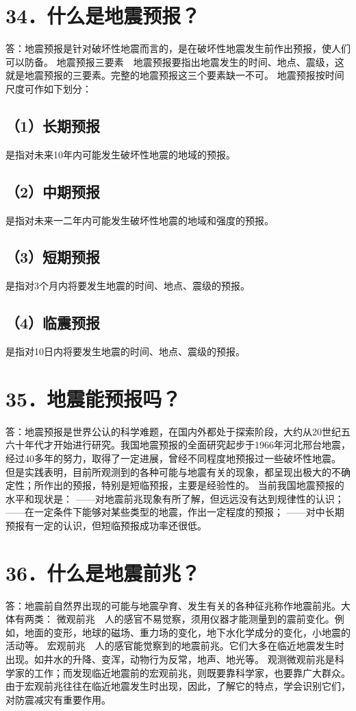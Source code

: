 \documentclass[a4paper,10pt,english]{sphinxmanual}
\begin{document}
\section{34．什么是地震预报？}
\label{\detokenize{index:id36}}
答：地震预报是针对破坏性地震而言的，是在破坏性地震发生前作出预报，使人们可以防备。
地震预报三要素　地震预报要指出地震发生的时间、地点、震级，这就是地震预报的三要素。完整的地震预报这三个要素缺一不可。
地震预报按时间尺度可作如下划分：


\subsection{（1）长期预报}
\label{\detokenize{index:id37}}
是指对未来10年内可能发生破坏性地震的地域的预报。


\subsection{（2）中期预报}
\label{\detokenize{index:id38}}
是指对未来一二年内可能发生破坏性地震的地域和强度的预报。


\subsection{（3）短期预报}
\label{\detokenize{index:id39}}
是指对3个月内将要发生地震的时间、地点、震级的预报。


\subsection{（4）临震预报}
\label{\detokenize{index:id40}}
是指对10日内将要发生地震的时间、地点、震级的预报。


\section{35．地震能预报吗？}
\label{\detokenize{index:id41}}
答：地震预报是世界公认的科学难题，在国内外都处于探索阶段，大约从20世纪五六十年代才开始进行研究。我国地震预报的全面研究起步于1966年河北邢台地震，经过40多年的努力，取得了一定进展，曾经不同程度地预报过一些破坏性地震。
但是实践表明，目前所观测到的各种可能与地震有关的现象，都呈现出极大的不确定性；所作出的预报，特别是短临预报，主要是经验性的。
当前我国地震预报的水平和现状是：
——对地震前兆现象有所了解，但远远没有达到规律性的认识；
——在一定条件下能够对某些类型的地震，作出一定程度的预报；
——对中长期预报有一定的认识，但短临预报成功率还很低。


\section{36．什么是地震前兆？}
\label{\detokenize{index:id42}}
答：地震前自然界出现的可能与地震孕育、发生有关的各种征兆称作地震前兆。大体有两类：
微观前兆　人的感官不易觉察，须用仪器才能测量到的震前变化。例如，地面的变形，地球的磁场、重力场的变化，地下水化学成分的变化，小地震的活动等。
宏观前兆　人的感官能觉察到的地震前兆。它们大多在临近地震发生时出现。如井水的升降、变浑，动物行为反常，地声、地光等。
观测微观前兆是科学家的工作；而发现临近地震前的宏观前兆，则既要靠科学家，也要靠广大群众。由于宏观前兆往往在临近地震发生时出现，因此，了解它的特点，学会识别它们，对防震减灾有重要作用。
\end{document}
